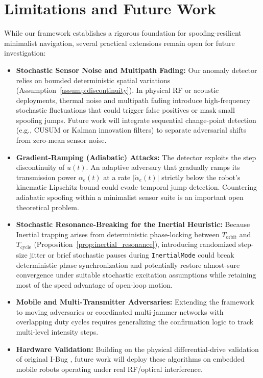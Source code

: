 \documentclass[12pt, a4paper]{article}
\begin{document}
\section{Limitations and Future Work}
\label{sec:limitations}
While our framework establishes a rigorous foundation for spoofing-resilient minimalist navigation, several practical extensions remain open for future investigation:

\begin{itemize}
    \item \textbf{Stochastic Sensor Noise and Multipath Fading:} Our anomaly detector relies on bounded deterministic spatial variations (Assumption~\ref{assump:discontinuity}). In physical RF or acoustic deployments, thermal noise and multipath fading introduce high-frequency stochastic fluctuations that could trigger false positives or mask small spoofing jumps. Future work will integrate sequential change-point detection (e.g., CUSUM \cite{basseville1993detection} or Kalman innovation filters) to separate adversarial shifts from zero-mean sensor noise.
    
    \item \textbf{Gradient-Ramping (Adiabatic) Attacks:} The detector exploits the step discontinuity of $u(t)$. An adaptive adversary that gradually ramps its transmission power $\alpha_e(t)$ at a rate $|\dot{\alpha}_e(t)|$ strictly below the robot's kinematic Lipschitz bound could evade temporal jump detection. Countering adiabatic spoofing within a minimalist sensor suite is an important open theoretical problem.
    
    \item \textbf{Stochastic Resonance-Breaking for the Inertial Heuristic:} Because Inertial trapping arises from deterministic phase-locking between $T_{\text{orbit}}$ and $T_{\text{cycle}}$ (Proposition~\ref{prop:inertial_resonance}), introducing randomized step-size jitter or brief stochastic pauses during \texttt{InertialMode} could break deterministic phase synchronization and potentially restore almost-sure convergence under suitable stochastic excitation assumptions while retaining most of the speed advantage of open-loop motion.
    
    \item \textbf{Mobile and Multi-Transmitter Adversaries:} Extending the framework to moving adversaries or coordinated multi-jammer networks with overlapping duty cycles requires generalizing the confirmation logic to track multi-level intensity steps.
    
    \item \textbf{Hardware Validation:} Building on the physical differential-drive validation of original I-Bug \cite{taylor2014intensity}, future work will deploy these algorithms on embedded mobile robots operating under real RF/optical interference.
\end{itemize}
\end{document}
